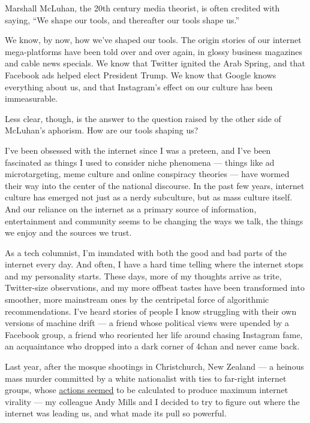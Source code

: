 Marshall McLuhan, the 20th century media theorist, is often credited
with saying, ``We shape our tools, and thereafter our tools shape us.''

We know, by now, how we've shaped our tools. The origin stories of our
internet mega-platforms have been told over and over again, in glossy
business magazines and cable news specials. We know that Twitter ignited
the Arab Spring, and that Facebook ads helped elect President Trump. We
know that Google knows everything about us, and that Instagram's effect
on our culture has been immeasurable.

Less clear, though, is the answer to the question raised by the other
side of McLuhan's aphorism. How are our tools shaping us?

I've been obsessed with the internet since I was a preteen, and I've
been fascinated as things I used to consider niche phenomena --- things
like ad microtargeting, meme culture and online conspiracy theories ---
have wormed their way into the center of the national discourse. In the
past few years, internet culture has emerged not just as a nerdy
subculture, but as mass culture itself. And our reliance on the internet
as a primary source of information, entertainment and community seems to
be changing the ways we talk, the things we enjoy and the sources we
trust.

As a tech columnist, I'm inundated with both the good and bad parts of
the internet every day. And often, I have a hard time telling where the
internet stops and my personality starts. These days, more of my
thoughts arrive as trite, Twitter-size observations, and my more offbeat
tastes have been transformed into smoother, more mainstream ones by the
centripetal force of algorithmic recommendations. I've heard stories of
people I know struggling with their own versions of machine drift --- a
friend whose political views were upended by a Facebook group, a friend
who reoriented her life around chasing Instagram fame, an acquaintance
who dropped into a dark corner of 4chan and never came back.

Last year, after the mosque shootings in Christchurch, New Zealand --- a
heinous mass murder committed by a white nationalist with ties to
far-right internet groups, whose
\href{https://www.nytimes3xbfgragh.onion/2019/03/15/technology/facebook-youtube-christchurch-shooting.html}{actions
seemed} to be calculated to produce maximum internet virality --- my
colleague Andy Mills and I decided to try to figure out where the
internet was leading us, and what made its pull so powerful.

